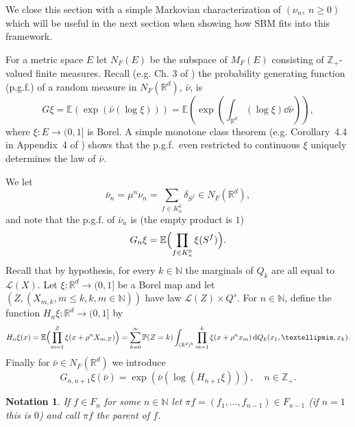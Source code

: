 \documentclass[12pt]{article}
\numberwithin{theorem}{section}
\theoremstyle{def}
\newtheorem*{notation}{Notation}
\numberwithin{equation}{section}
\renewcommand{\P}{\mathbb{P}}
\newcommand{\E}{\mathbb{E}}
\newcommand{\R}{\mathbb{R}}
\newcommand{\Z}{\mathbb{Z}}
\newcommand{\N}{\mathbb{N}}
\newcommand{\cL}{\mathcal{L}}
\begin{document}
We close this section with a simple Markovian characterization of $(\nu_n, \ n\geq 0)$ which will be useful in the next section when showing how SBM fits into this framework. 

For a metric space $E$ let $N_F(E)$ be the subspace of $M_F(E)$ consisting of $\Z_+$-valued finite measures.
Recall (e.g. Ch. 3 of \cite{DI78}) the probability generating function (p.g.f.) of a random measure in $N_F(\R^d)$, $\bar\nu$, is 
\begin{equation*}
	G\xi=\E(\exp(\bar\nu(\log\xi))) =\E\left(\exp \left( \int_{\R^d} (\log \xi)  \dd \bar\nu\right)\right), 
\end{equation*}
where $\xi:E\to(0,1]$ is Borel. 
A simple monotone class theorem (e.g. Corollary~4.4 in Appendix~4 of \cite{EK}) shows that the p.g.f.\ even restricted to continuous $\xi$ uniquely determines the law of $\bar \nu$.

We let
\[\bar\nu_n=\mu^n\nu_n=\sum_{f\in K^0_n}\delta_{S^f}\in N_F(\R^d),\]
and note that the p.g.f. of $\bar\nu_n$ is (the empty product is $1$)
\begin{equation}\label{nunpgf}
G_n\xi=\E\Bigl(\prod_{f\in K^0_n}\xi(S^f)\Bigr).
\end{equation}
 Recall that by hypothesis, for every $k\in \N$ the marginals of $Q_k$ are all equal to $\cL(X)$.
Let $\xi:\R^d\to(0,1]$ be a Borel map and let $(Z,(X_{m,k},m\le k, k,m\in\N))$ have law $\cL(Z)\times Q^s$.  For $n\in\N$, define the function $H_n\xi:\R^d\to(0,1]$ by
\begin{equation}\label{Hndef}H_n\xi(x)=\E\Bigl(\prod_{m=1}^Z\xi(x+\rho^{n}X_{m,Z})\Bigr)=\sum_{k=0}^\infty \P(Z=k)\int_{(\R^d)^k}\prod_{m=1}^k\xi(x+\rho^nx_m)\,\dd Q_k(x_1,\dots,x_k).
\end{equation}
Finally for $\bar\nu\in N_F(\R^d)$ we introduce
\[G_{n,n+1}\xi(\bar\nu)=\exp(\bar\nu(\log(H_{n+1}\xi))),\quad n\in\Z_+.\]

\begin{notation} If $f\in F_n$ for some $n\in\N$ let $\pi f=(f_1,\dots, f_{n-1})\in F_{n-1}$ (if $n=1$ this is $0$) and call $\pi f$ the parent of $f$. 
\end{notation} 
\end{document}
